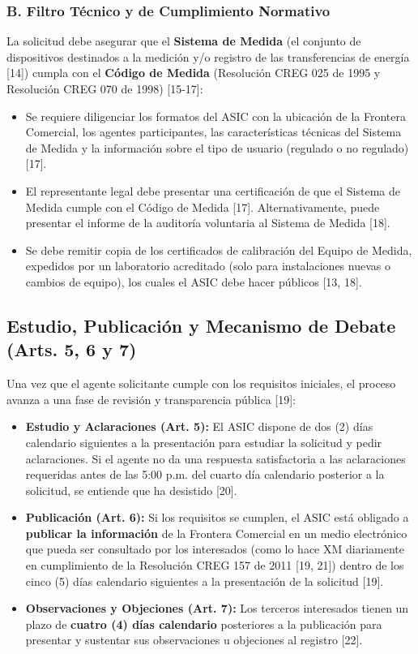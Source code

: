 \documentclass[a5paper]{book}%
\begin{document}
  \subsubsection*{B. Filtro Técnico y de Cumplimiento Normativo}
  La solicitud debe asegurar que el \textbf{Sistema de Medida} (el conjunto de dispositivos destinados a la medición y/o registro de las transferencias de energía [14]) cumpla con el \textbf{Código de Medida} (Resolución CREG 025 de 1995 y Resolución CREG 070 de 1998) [15-17]:
  \begin{itemize}
  	\item Se requiere diligenciar los formatos del ASIC con la ubicación de la Frontera Comercial, los agentes participantes, las características técnicas del Sistema de Medida y la información sobre el tipo de usuario (regulado o no regulado) [17].
  	\item El representante legal debe presentar una certificación de que el Sistema de Medida cumple con el Código de Medida [17]. Alternativamente, puede presentar el informe de la auditoría voluntaria al Sistema de Medida [18].
  	\item Se debe remitir copia de los certificados de calibración del Equipo de Medida, expedidos por un laboratorio acreditado (solo para instalaciones nuevas o cambios de equipo), los cuales el ASIC debe hacer públicos [13, 18].
  \end{itemize}
  
  \subsection{Estudio, Publicación y Mecanismo de Debate (Arts. 5\textdegree, 6\textdegree{} y 7\textdegree)}
  
  Una vez que el agente solicitante cumple con los requisitos iniciales, el proceso avanza a una fase de revisión y transparencia pública [19]:
  
  \begin{itemize}
  	\item \textbf{Estudio y Aclaraciones (Art. 5\textdegree):} El ASIC dispone de dos (2) días calendario siguientes a la presentación para estudiar la solicitud y pedir aclaraciones. Si el agente no da una respuesta satisfactoria a las aclaraciones requeridas antes de las 5:00 p.m. del cuarto día calendario posterior a la solicitud, se entiende que ha desistido [20].
  	\item \textbf{Publicación (Art. 6\textdegree):} Si los requisitos se cumplen, el ASIC está obligado a \textbf{publicar la información} de la Frontera Comercial en un medio electrónico que pueda ser consultado por los interesados (como lo hace XM diariamente en cumplimiento de la Resolución CREG 157 de 2011 [19, 21]) dentro de los cinco (5) días calendario siguientes a la presentación de la solicitud [19].
  	\item \textbf{Observaciones y Objeciones (Art. 7\textdegree):} Los terceros interesados tienen un plazo de \textbf{cuatro (4) días calendario} posteriores a la publicación para presentar y sustentar sus observaciones u objeciones al registro [22].
  \end{itemize}
  
\end{document}
